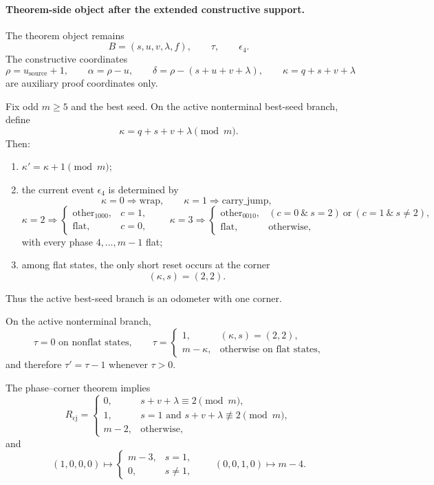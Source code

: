 \paragraph{Theorem-side object after the extended constructive support.}
The theorem object remains
\[
B=(s,u,v,\lambda,f),\qquad \tau,\qquad \epsilon_4.
\]
The constructive coordinates
\[
\rho=u_{\mathrm{source}}+1,
\qquad
\alpha=\rho-u,
\qquad
\delta=\rho-(s+u+v+\lambda),
\qquad
\kappa=q+s+v+\lambda
\]
are auxiliary proof coordinates only.

\begin{theorem}
Fix odd $m\ge 5$ and the best seed. On the active nonterminal best-seed branch, define
\[
\kappa=q+s+v+\lambda \pmod m.
\]
Then:
\begin{enumerate}
\item $\kappa' = \kappa+1 \pmod m$;
\item the current event $\epsilon_4$ is determined by
\[
\kappa=0 \Rightarrow \mathrm{wrap},
\qquad
\kappa=1 \Rightarrow \mathrm{carry\_jump},
\]
\[
\kappa=2 \Rightarrow
\begin{cases}
\mathrm{other}_{1000},& c=1,\\
\mathrm{flat},& c=0,
\end{cases}
\qquad
\kappa=3 \Rightarrow
\begin{cases}
\mathrm{other}_{0010},& (c=0\ \&\ s=2)\ \text{or}\ (c=1\ \&\ s\neq 2),\\
\mathrm{flat},& \text{otherwise},
\end{cases}
\]
with every phase $4,\dots,m-1$ flat;
\item among flat states, the only short reset occurs at the corner
\[
(\kappa,s)=(2,2).
\]
\end{enumerate}
Thus the active best-seed branch is an odometer with one corner.
\end{theorem}

\begin{corollary}
On the active nonterminal branch,
\[
\tau=0 \text{ on nonflat states},
\qquad
\tau=
\begin{cases}
1,& (\kappa,s)=(2,2),\\
m-\kappa,& \text{otherwise on flat states},
\end{cases}
\]
and therefore $\tau' = \tau-1$ whenever $\tau>0$.
\end{corollary}

\begin{corollary}
The phase--corner theorem implies
\[
R_{\mathrm{cj}}=
\begin{cases}
0,& s+v+\lambda\equiv 2 \pmod m,\\
1,& s=1 \text{ and } s+v+\lambda\not\equiv 2 \pmod m,\\
m-2,& \text{otherwise,}
\end{cases}
\]
and
\[
(1,0,0,0)\mapsto
\begin{cases}
m-3,& s=1,\\
0,& s\neq 1,
\end{cases}
\qquad
(0,0,1,0)\mapsto m-4.
\]
\end{corollary}

